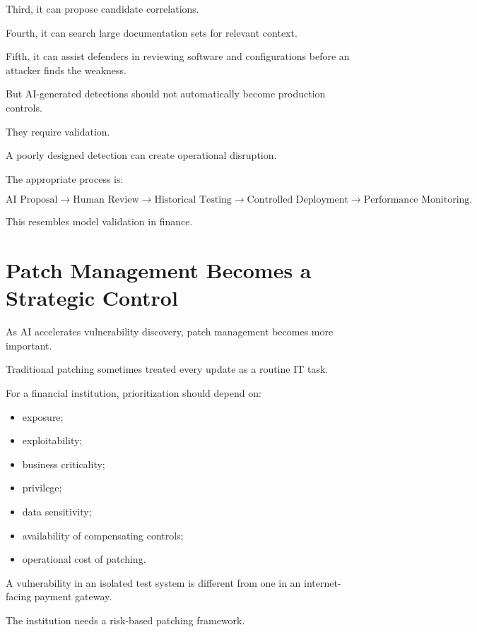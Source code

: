Third, it can propose candidate correlations.

Fourth, it can search large documentation sets for relevant context.

Fifth, it can assist defenders in reviewing software and configurations before an attacker finds the weakness.

But AI-generated detections should not automatically become production controls.

They require validation.

A poorly designed detection can create operational disruption.

The appropriate process is:

\begin{equation}
\text{AI Proposal}
\rightarrow
\text{Human Review}
\rightarrow
\text{Historical Testing}
\rightarrow
\text{Controlled Deployment}
\rightarrow
\text{Performance Monitoring}.
\end{equation}

This resembles model validation in finance.

\section{Patch Management Becomes a Strategic Control}

As AI accelerates vulnerability discovery, patch management becomes more important.

Traditional patching sometimes treated every update as a routine IT task.

For a financial institution, prioritization should depend on:

\begin{itemize}
    \item exposure;
    \item exploitability;
    \item business criticality;
    \item privilege;
    \item data sensitivity;
    \item availability of compensating controls;
    \item operational cost of patching.
\end{itemize}

A vulnerability in an isolated test system is different from one in an internet-facing payment gateway.

The institution needs a risk-based patching framework.

